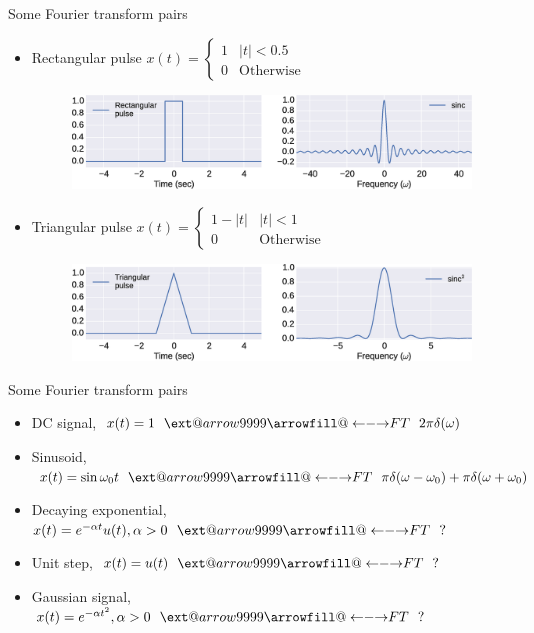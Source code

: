 \documentclass{beamer}
\makeatletter
\newcommand\xleftrightarrow[2][]{%
  \ext@arrow 9999{\longleftrightarrowfill@}{#1}{#2}}
\newcommand\longleftrightarrowfill@{%
  \arrowfill@\leftarrow\relbar\rightarrow}
\makeatother
\begin{document}
\begin{frame}{Some Fourier transform pairs}
\begin{itemize}
\item Rectangular pulse $x(t) = \begin{cases} 1 & \left|t\right| < 0.5 \\ 0 & \text{Otherwise} \end{cases}$
\begin{figure}
\includegraphics[width=\textwidth]{img/ft_rect_sinc.eps}
\end{figure}

\item Triangular pulse $x(t) = \begin{cases} 1 - \left|t\right| & \left|t\right| < 1 \\ 0 & \text{Otherwise} \end{cases}$
\begin{figure}
\includegraphics[width=\textwidth]{img/ft_tri_sinc2.eps}
\end{figure}
\end{itemize}

\end{frame}

\begin{frame}{Some Fourier transform pairs}
\begin{itemize}
\item DC signal, $x(t) = 1 \,\,\,\, \xleftrightarrow{FT} \,\,\,\, 2\pi \delta(\omega)$

\item Sinusoid, $x(t) = \sin \omega_0t \,\,\,\, \xleftrightarrow{FT} \,\,\,\, \pi \delta(\omega-\omega_0) + \pi \delta(\omega + \omega_0)$

\item Decaying exponential, $x(t) = e^{-\alpha t}u(t), \alpha > 0 \,\,\,\, \xleftrightarrow{FT} \,\,\,\, ?$

\item Unit step, $x(t) = u(t) \,\,\,\, \xleftrightarrow{FT} \,\,\,\, ? $

\item Gaussian signal, $x(t) = e^{-\alpha t^2}, \alpha > 0 \,\,\,\, \xleftrightarrow{FT} \,\,\,\, ? $

\end{itemize}

\end{frame}
\end{document}
